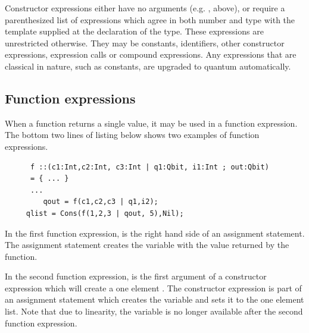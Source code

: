 
Constructor expressions either have no arguments
 (e.g. ,  above), or
require a parenthesized list of expressions which agree in both
number and type with the template supplied at the declaration of the
type. These expressions are unrestricted otherwise. They may be constants,
identifiers, other constructor expressions, expression calls or compound
expressions. Any expressions that are classical in nature, such as constants,
are upgraded to quantum automatically.

\subsection{Function expressions}\label{subsec:expressioncalls}
When a function returns a single value, it may be used in a
function expression. The bottom two lines of listing below shows
two examples of function expressions. 
\begin{lstlisting}
      f ::(c1:Int,c2:Int, c3:Int | q1:Qbit, i1:Int ; out:Qbit)
      = { ... }
      ...
         qout = f(c1,c2,c3 | q1,i2);
	 qlist = Cons(f(1,2,3 | qout, 5),Nil);
\end{lstlisting}
In the first function expression,  is the right hand side of 
an assignment statement. The assignment statement
 creates the variable 
with the value returned by the function.

In the second function expression,  is the first argument of a 
constructor expression which will create a one element .
The constructor expression is part of an assignment statement which
creates the variable  and sets it to
the one element list. Note that due to linearity, the variable 
 is no longer available after the second function expression.

